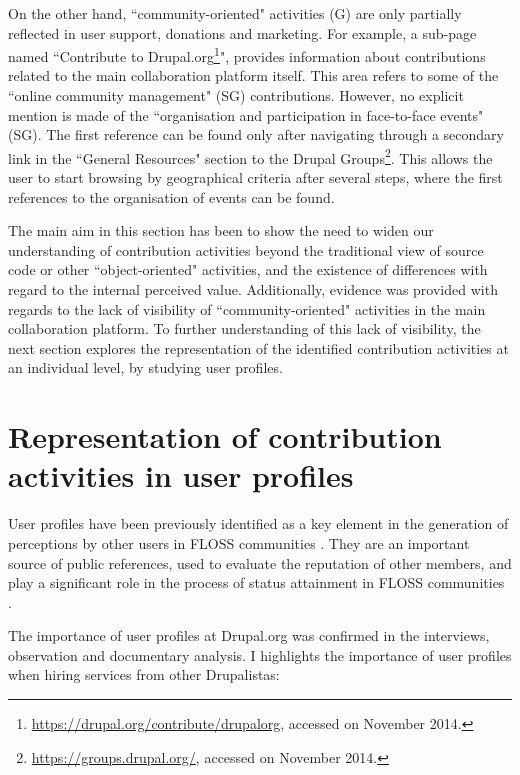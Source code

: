 On the other hand, ``community-oriented" activities (G)  are only partially reflected in user support, donations and marketing. For example, a sub-page named ``Contribute to Drupal.org\footnote{\url{https://drupal.org/contribute/drupalorg}, accessed on  November 2014.}", provides information about contributions related to the main collaboration platform itself. This area refers to some of the ``online community management" (SG) contributions. However, no explicit mention is made of the ``organisation and participation in face-to-face events" (SG). The first reference can be found only after navigating through a secondary link in the ``General Resources" section to the Drupal Groups\footnote{\url{https://groups.drupal.org/}, accessed on  November 2014.}. This allows the user to start browsing by geographical criteria after several steps, where the first references to the organisation of events can be found.

The main aim in this section has been to show the need to widen our understanding of contribution activities beyond the traditional view of source code or other ``object-oriented" activities, and the existence of differences with regard to the internal perceived value. Additionally, evidence was provided with regards to  the lack of visibility of  ``community-oriented" activities in the main collaboration platform. To further understanding of this lack of visibility, the next section explores the representation of the identified contribution activities at an individual level, by studying user profiles.


\section{Representation of contribution activities in user profiles}
\label{subsec:insights:representation}

User profiles have been previously identified  as a key element in the generation of perceptions by other users in FLOSS communities \parencite{Marlow:2013:IFO:2441776.2441792}. They are an important source of public references, used to evaluate the reputation of other members, and play a significant role in the process of status attainment in FLOSS communities \parencite{Stewart2005}.

The importance of user profiles at Drupal.org was confirmed in the interviews, observation and documentary analysis. I highlights the importance of user profiles when hiring services from other Drupalistas:

